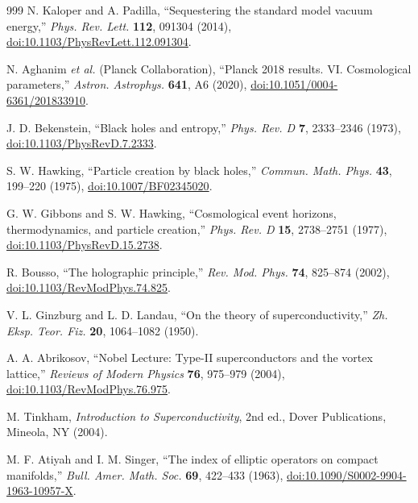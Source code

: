 \documentclass[aps,prd,reprint,nofootinbib,superscriptaddress,floatfix]{revtex4-2}
\numberwithin{equation}{section}
\theoremstyle{definition}
\theoremstyle{plain}
\begin{document}
\begin{thebibliography}{999}
N. Kaloper and A. Padilla,
``Sequestering the standard model vacuum energy,''
\emph{Phys. Rev. Lett.} \textbf{112}, 091304 (2014),
\href{https://doi.org/10.1103/PhysRevLett.112.091304}{doi:10.1103/PhysRevLett.112.091304}.

N. Aghanim \emph{et al.} (Planck Collaboration),
``Planck 2018 results. VI. Cosmological parameters,''
\emph{Astron. Astrophys.} \textbf{641}, A6 (2020),
\href{https://doi.org/10.1051/0004-6361/201833910}{doi:10.1051/0004-6361/201833910}.

J. D. Bekenstein,
``Black holes and entropy,''
\emph{Phys. Rev. D} \textbf{7}, 2333--2346 (1973),
\href{https://doi.org/10.1103/PhysRevD.7.2333}{doi:10.1103/PhysRevD.7.2333}.

S. W. Hawking,
``Particle creation by black holes,''
\emph{Commun. Math. Phys.} \textbf{43}, 199--220 (1975),
\href{https://doi.org/10.1007/BF02345020}{doi:10.1007/BF02345020}.

G. W. Gibbons and S. W. Hawking,
``Cosmological event horizons, thermodynamics, and particle creation,''
\emph{Phys. Rev. D} \textbf{15}, 2738--2751 (1977),
\href{https://doi.org/10.1103/PhysRevD.15.2738}{doi:10.1103/PhysRevD.15.2738}.


R. Bousso,
``The holographic principle,''
\emph{Rev. Mod. Phys.} \textbf{74}, 825--874 (2002),
\href{https://doi.org/10.1103/RevModPhys.74.825}{doi:10.1103/RevModPhys.74.825}.



V. L. Ginzburg and L. D. Landau,
``On the theory of superconductivity,''
\emph{Zh. Eksp. Teor. Fiz.} \textbf{20}, 1064--1082 (1950).

A. A. Abrikosov,
``Nobel Lecture: Type-II superconductors and the vortex lattice,''
\emph{Reviews of Modern Physics} \textbf{76}, 975--979 (2004),
\href{https://doi.org/10.1103/RevModPhys.76.975}{doi:10.1103/RevModPhys.76.975}.

M. Tinkham,
\emph{Introduction to Superconductivity}, 2nd ed.,
Dover Publications, Mineola, NY (2004).

M. F. Atiyah and I. M. Singer,
``The index of elliptic operators on compact manifolds,''
\emph{Bull. Amer. Math. Soc.} \textbf{69}, 422--433 (1963),
\href{https://doi.org/10.1090/S0002-9904-1963-10957-X}{doi:10.1090/S0002-9904-1963-10957-X}.


\end{thebibliography}
\end{document}
